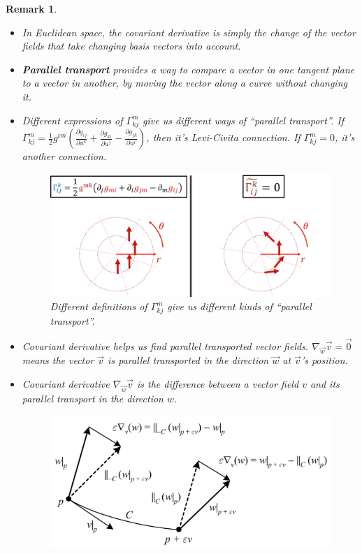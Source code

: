 \documentclass[a4paper]{article}
\theoremstyle{definition}
\theoremstyle{plain}
\newtheorem{remark}{Remark}
\begin{document}
\begin{remark}
\begin{itemize}
    \item In Euclidean space, the covariant derivative is simply the change of the vector fields that take changing basis vectors into account.
    \item \textbf{Parallel transport} provides a way to compare a vector in one tangent plane to a vector in another, by moving the vector along a curve without changing it.
    \item Different expressions of $\Gamma^m_{kj}$ give us different ways of ``parallel transport''. If $\Gamma^m_{kj}=\frac{1}{2}g^{im}\left(\frac{\partial g_{ij}}{\partial u^k}+\frac{\partial g_{ki}}{\partial u^j}-\frac{\partial g_{jk}}{\partial u^i}\right)$, then it's Levi-Civita connection. If $\Gamma^m_{kj}=0$, it's another connection.
    \begin{figure}[H]
        \centering
        \includegraphics[scale=0.25]{figure/paralleltransport.png}
        \caption{Different definitions of $\Gamma^m_{kj}$ give us different kinds of ``parallel transport''.}
    \end{figure}
    \item Covariant derivative helps us find parallel transported vector fields. $\nabla_{\vec{w}}\vec{v}=\vec{0}$ means the vector $\Vec{v}$ is parallel transported in the direction $\Vec{w}$ at $\Vec{v}$'s position.
    \item \cite{rg} Covariant derivative $\nabla_{\vec{w}}\vec{v}$ is the difference between a vector field $v$ and its parallel transport in the direction $w$.
    \begin{figure}[H]
        \centering
        \includegraphics[scale=0.2]{figure/difference.png}

\end{figure}
\end{itemize}
\end{remark}
\end{document}

